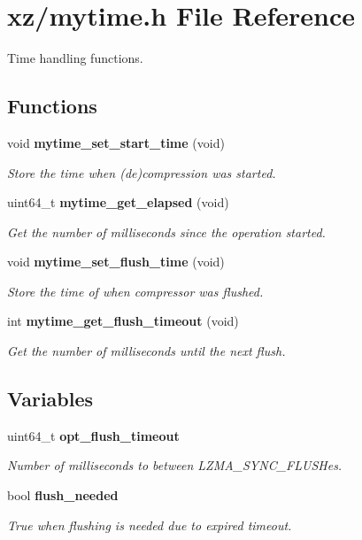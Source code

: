 \section{xz/mytime.h File Reference}
\label{mytime_8h}


Time handling functions.  


\subsection*{Functions}
\begin{DoxyCompactItemize}
\item 
void \textbf{ mytime\+\_\+set\+\_\+start\+\_\+time} (void)
\begin{DoxyCompactList}\small\item\em Store the time when (de)compression was started. \end{DoxyCompactList}\item 
uint64\+\_\+t \textbf{ mytime\+\_\+get\+\_\+elapsed} (void)
\begin{DoxyCompactList}\small\item\em Get the number of milliseconds since the operation started. \end{DoxyCompactList}\item 
void \textbf{ mytime\+\_\+set\+\_\+flush\+\_\+time} (void)
\begin{DoxyCompactList}\small\item\em Store the time of when compressor was flushed. \end{DoxyCompactList}\item 
int \textbf{ mytime\+\_\+get\+\_\+flush\+\_\+timeout} (void)
\begin{DoxyCompactList}\small\item\em Get the number of milliseconds until the next flush. \end{DoxyCompactList}\end{DoxyCompactItemize}
\subsection*{Variables}
\begin{DoxyCompactItemize}
\item 
uint64\+\_\+t \textbf{ opt\+\_\+flush\+\_\+timeout}
\begin{DoxyCompactList}\small\item\em Number of milliseconds to between L\+Z\+M\+A\+\_\+\+S\+Y\+N\+C\+\_\+\+F\+L\+U\+S\+Hes. \end{DoxyCompactList}\item 
bool \textbf{ flush\+\_\+needed}
\begin{DoxyCompactList}\small\item\em True when flushing is needed due to expired timeout. \end{DoxyCompactList}\end{DoxyCompactItemize}


